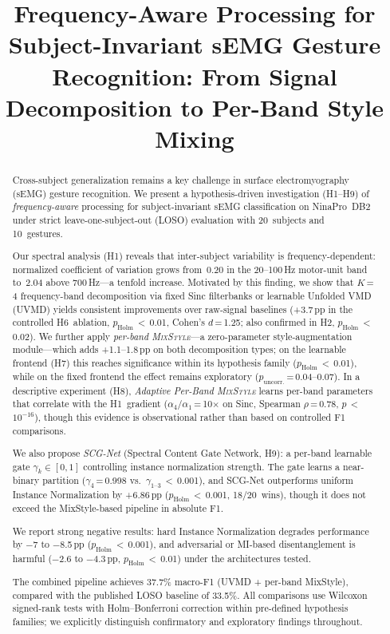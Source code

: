\documentclass[conference]{IEEEtran}
\title{Frequency-Aware Processing for Subject-Invariant sEMG Gesture Recognition: From Signal Decomposition to Per-Band Style Mixing}
\author{
\IEEEauthorblockN{Kirill Golovan, Irina Zvereva}
\IEEEauthorblockA{%
Department of Information Technologies\\
National Research University Higher School of Economics\\
Moscow, Russia\\
\texttt{kgolovan@edu.hse.ru}}
}
\newcommand{\pp}{\,pp}
\newcommand{\mixstyle}{\textsc{MixStyle}}
\newcommand{\uvmd}{\textsc{UVMD}}
\begin{document}
\maketitle

\begin{abstract}
Cross-subject generalization remains a key challenge in surface electromyography (sEMG) gesture recognition.
We present a hypothesis-driven investigation (H1--H9) of \emph{frequency-aware} processing for subject-invariant sEMG classification on NinaPro~DB2 under strict leave-one-subject-out (LOSO) evaluation with 20~subjects and 10~gestures.

Our spectral analysis (H1) reveals that inter-subject variability is frequency-dependent: normalized coefficient of variation grows from~0.20 in the 20--100\,Hz motor-unit band to~2.04 above 700\,Hz---a tenfold increase.
Motivated by this finding, we show that $K$\,=\,4 frequency-band decomposition via fixed Sinc filterbanks or learnable Unfolded VMD (\uvmd{}) yields consistent improvements over raw-signal baselines (+3.7\pp{} in the controlled H6~ablation, $p_{\mathrm{Holm}}$\,$<$\,0.01, Cohen's $d$\,=\,1.25; also confirmed in H2, $p_{\mathrm{Holm}}$\,$<$\,0.02).
We further apply \emph{per-band \mixstyle{}}---a zero-parameter style-augmentation module---which adds +1.1--1.8\pp{} on both decomposition types; on the learnable frontend (H7) this reaches significance within its hypothesis family ($p_{\mathrm{Holm}}$\,$<$\,0.01), while on the fixed frontend the effect remains exploratory ($p_{\mathrm{uncorr.}}$\,=\,0.04--0.07).
In a descriptive experiment (H8), \emph{Adaptive Per-Band \mixstyle{}} learns per-band parameters that correlate with the H1~gradient ($\alpha_4/\alpha_1$\,=\,10$\times$ on Sinc, Spearman $\rho$\,=\,0.78, $p$\,$<$\,$10^{-16}$), though this evidence is observational rather than based on controlled F1 comparisons.

We also propose \emph{SCG-Net} (Spectral Content Gate Network, H9): a per-band learnable gate $\gamma_k \in [0,1]$ controlling instance normalization strength.
The gate learns a near-binary partition ($\gamma_4$\,=\,0.998 vs.\ $\gamma_{1\text{--}3}$\,$<$\,0.001), and SCG-Net outperforms uniform Instance Normalization by +6.86\pp{} ($p_{\mathrm{Holm}}$\,$<$\,0.001, 18/20~wins), though it does not exceed the MixStyle-based pipeline in absolute F1.

We report strong negative results: hard Instance Normalization degrades performance by $-$7 to $-$8.5\pp{} ($p_{\mathrm{Holm}}$\,$<$\,0.001), and adversarial or MI-based disentanglement is harmful ($-$2.6 to $-$4.3\pp{}, $p_{\mathrm{Holm}}$\,$<$\,0.01) under the architectures tested.

The combined pipeline achieves 37.7\% macro-F1 (UVMD + per-band MixStyle), compared with the published LOSO baseline of 33.5\%.
All comparisons use Wilcoxon signed-rank tests with Holm--Bonferroni correction within pre-defined hypothesis families; we explicitly distinguish confirmatory and exploratory findings throughout.
\end{abstract}
\end{document}
